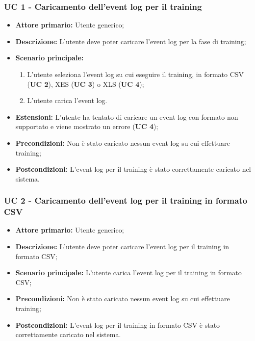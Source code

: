 \subsubsection{UC 1 - Caricamento dell'event log per il training}
\begin{itemize}
	\item \textbf{Attore primario:} Utente generico;
	\item \textbf{Descrizione:} L'utente deve poter caricare l'event log per la fase di training;
	\item \textbf{Scenario principale:} 
		\begin{enumerate}
			\item L'utente seleziona l'event log su cui eseguire il training, in formato CSV (\textbf{UC 2}), XES (\textbf{UC 3}) o XLS (\textbf{UC 4});
			\item L'utente carica l'event log.
		\end{enumerate}
	\item \textbf{Estensioni:} L'utente ha tentato di caricare un event log con formato non supportato e viene mostrato un errore (\textbf{UC 4});
	\item \textbf{Precondizioni:} Non è stato caricato nessun event log su cui effettuare training;
	\item \textbf{Postcondizioni:} L'event log per il training è stato correttamente caricato nel sistema.

\end{itemize}

\subsubsection{UC 2 - Caricamento dell'event log per il training in formato CSV}
\begin{itemize}
	\item \textbf{Attore primario:} Utente generico;
	\item \textbf{Descrizione:} L'utente deve poter caricare l'event log per il training in formato CSV;
	\item \textbf{Scenario principale:} L'utente carica l'event log per il training in formato CSV;
	\item \textbf{Precondizioni:} Non è stato caricato nessun event log su cui effettuare training;
	\item \textbf{Postcondizioni:} L'event log per il training in formato CSV è stato correttamente caricato nel sistema.

\end{itemize}

